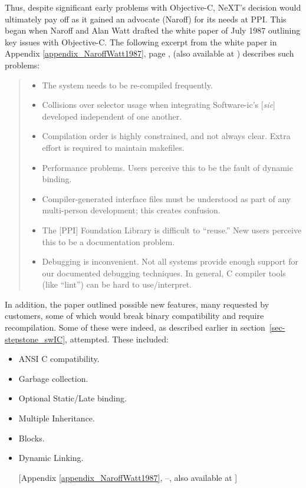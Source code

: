 \documentclass[acmsmall,screen]{acmart}
\begin{document}
Thus, despite significant early problems with Objective-C, NeXT's decision would ultimately pay off as it gained an advocate (Naroff) for its needs at PPI. This began when Naroff and Alan Watt drafted the white paper of July 1987 outlining key issues with Objective-C. The following excerpt from the white paper in Appendix \ref{appendix_NaroffWatt1987}, page , (also available at \citealp[2]{naroff_design_1987}) describes such problems:
\begin{quotation}
\begin{itemize}
\item The system needs to be re-compiled frequently.
\item Collisions over selector usage when integrating Software-ic's [\emph{sic}] developed independent of one another.
\item Compilation order is highly constrained, and not always clear. Extra effort is required to maintain makefiles.
\item Performance problems. Users perceive this to be the fault of dynamic binding.
\item Compiler-generated interface files must be understood as part of any multi-person development; this creates confusion.
\item The [PPI] Foundation Library is difficult to ``reuse.'' New users perceive this to be a documentation problem.
\item Debugging is inconvenient. Not all systems provide enough support for our documented debugging techniques. In general, C compiler tools (like ``lint'') can be hard to use/interpret.
\end{itemize}
\end{quotation}
In addition, the paper outlined possible new features, many requested by customers, some of which would break binary compatibility and require recompilation. Some of these were indeed, as described earlier in section~\ref{sec-stepstone_swIC}, attempted. These included:
\begin{itemize}
\item ANSI C compatibility.
\item Garbage collection.
\item Optional Static/Late binding.
\item Multiple Inheritance.
\item Blocks.
\item Dynamic Linking. 
\addtocounter{appendixpagenumrangestart}{3}
\addtocounter{appendixpagenumrangeend}{7}
[Appendix  \ref{appendix_NaroffWatt1987},  --,
also available at \citealp[5--9]{naroff_design_1987}]
\end{itemize}
\end{document}

